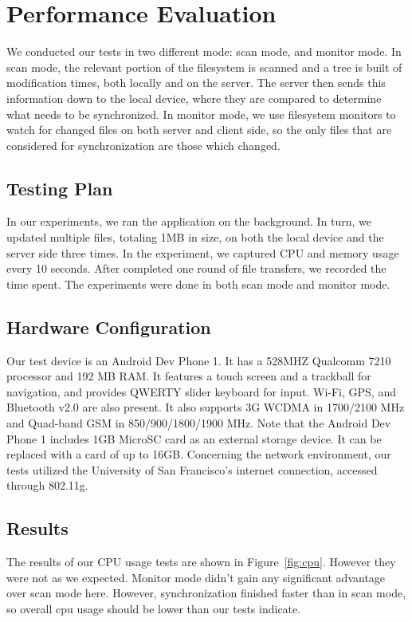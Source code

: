 \section{Performance Evaluation}
\label{sec:Performance}

We conducted our tests in two different mode: scan mode, and monitor mode. In scan mode, the relevant portion of the filesystem is scanned and a tree is built of modification times, both locally and on the server.  The server then sends this information down to the local device, where they are compared to determine what needs to be synchronized. In monitor mode, we use filesystem monitors to watch for changed files on both server and client side, so the only files that are considered for synchronization are those which changed. 


\subsection{Testing Plan}
In our experiments, we ran the \teledroid application on the background. In turn, we updated multiple files, totaling 1MB in size, on both the local device and the server side three times. In the experiment, we captured CPU and memory usage every 10 seconds. After \teledroid completed one round of file transfers, we recorded the time spent. The experiments were done in both scan mode and monitor mode.
			
\subsection{Hardware Configuration}
Our test device is an Android Dev Phone 1. It has a 528MHZ Qualcomm 7210 processor and 192 MB RAM. It features a touch screen and a trackball for navigation, and provides QWERTY slider keyboard for input. Wi-Fi, GPS, and Bluetooth v2.0 are also present. It also supports 3G WCDMA in 1700/2100 MHz and Quad-band GSM in 850/900/1800/1900 MHz. Note that the Android Dev Phone 1 includes 1GB MicroSC card as an external storage device. It can be replaced with a card of up to 16GB. Concerning the network environment, our tests utilized the University of San Francisco's internet connection, accessed through 802.11g.

\subsection{Results}
The results of our CPU usage tests are shown in Figure~\ref{fig:cpu}. However they were not as we expected. Monitor mode didn't gain any significant advantage over scan mode here. However, synchronization finished faster than in scan mode, so overall cpu usage should be lower than our tests indicate.

